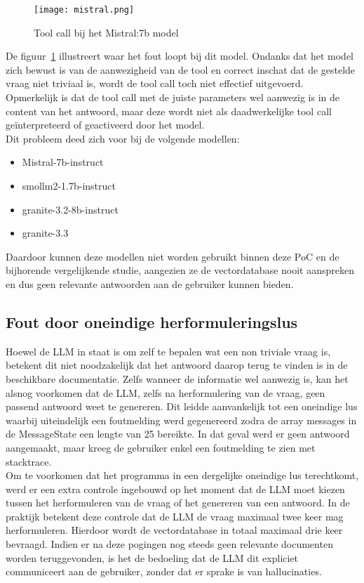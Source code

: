\begin{figure}[H]
    \texttt{[image: mistral.png]}
    \caption{Tool call bij het Mistral:7b model}
    \label{fig:Mistral}
\end{figure}

De figuur~\ref{fig:Mistral} illustreert waar het fout loopt bij dit model. Ondanks dat het model zich bewust is van de aanwezigheid van de tool en correct inschat dat de gestelde vraag niet triviaal is, wordt de tool call toch niet effectief uitgevoerd.
\\[1em]
Opmerkelijk is dat de tool call met de juiste parameters wel aanwezig is in de content van het antwoord, maar deze wordt niet als daadwerkelijke tool call geïnterpreteerd of geactiveerd door het model.
\\[1em]
Dit probleem deed zich voor bij de volgende modellen:
\begin{itemize}
    \item Mistral-7b-instruct
    \item smollm2-1.7b-instruct
    \item granite-3.2-8b-instruct
    \item granite-3.3
\end{itemize}

 Daardoor kunnen deze modellen niet worden gebruikt binnen deze PoC en de bijhorende vergelijkende studie, aangezien ze de vectordatabase nooit aanspreken en dus geen relevante antwoorden aan de gebruiker kunnen bieden.

\subsection{Fout door oneindige herformuleringslus}

Hoewel de LLM in staat is om zelf te bepalen wat een non triviale vraag is, betekent dit niet noodzakelijk dat het antwoord daarop terug te vinden is in de beschikbare documentatie. Zelfs wanneer de informatie wel aanwezig is, kan het alsnog voorkomen dat de LLM, zelfs na herformulering van de vraag, geen passend antwoord weet te genereren. Dit leidde aanvankelijk tot een oneindige lus waarbij uiteindelijk een foutmelding werd gegenereerd zodra de array messages in de MessageState een lengte van 25 bereikte. In dat geval werd er geen antwoord aangemaakt, maar kreeg de gebruiker enkel een foutmelding te zien met stacktrace.
\\[1em]
Om te voorkomen dat het programma in een dergelijke oneindige lus terechtkomt, werd er een extra controle ingebouwd op het moment dat de LLM moet kiezen tussen het herformuleren van de vraag of het genereren van een antwoord. In de praktijk betekent deze controle dat de LLM de vraag maximaal twee keer mag herformuleren. Hierdoor wordt de vectordatabase in totaal maximaal drie keer bevraagd. Indien er na deze pogingen nog steeds geen relevante documenten worden teruggevonden, is het de bedoeling dat de LLM dit expliciet communiceert aan de gebruiker, zonder dat er sprake is van hallucinaties. 


